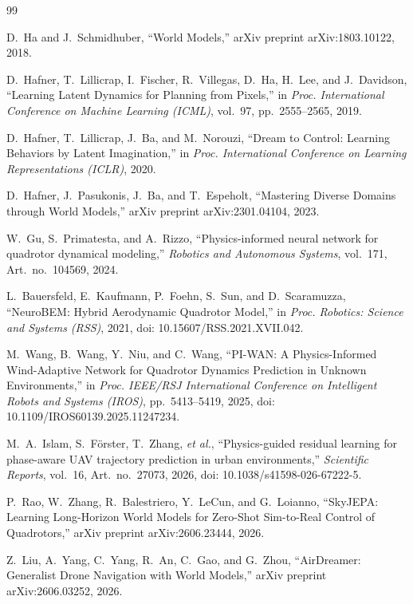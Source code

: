 \documentclass[conference]{IEEEtran}
\begin{document}
\begin{thebibliography}{99}

D.~Ha and J.~Schmidhuber,
``World Models,''
arXiv preprint arXiv:1803.10122, 2018.

D.~Hafner, T.~Lillicrap, I.~Fischer, R.~Villegas, D.~Ha, H.~Lee,
and J.~Davidson,
``Learning Latent Dynamics for Planning from Pixels,''
in \emph{Proc. International Conference on Machine Learning (ICML)},
vol.~97, pp.~2555--2565, 2019.

D.~Hafner, T.~Lillicrap, J.~Ba, and M.~Norouzi,
``Dream to Control: Learning Behaviors by Latent Imagination,''
in \emph{Proc. International Conference on Learning Representations
(ICLR)}, 2020.

D.~Hafner, J.~Pasukonis, J.~Ba, and T.~Espeholt,
``Mastering Diverse Domains through World Models,''
arXiv preprint arXiv:2301.04104, 2023.

W.~Gu, S.~Primatesta, and A.~Rizzo,
``Physics-informed neural network for quadrotor dynamical modeling,''
\emph{Robotics and Autonomous Systems}, vol.~171, Art.~no.~104569,
2024.

L.~Bauersfeld, E.~Kaufmann, P.~Foehn, S.~Sun, and D.~Scaramuzza,
``NeuroBEM: Hybrid Aerodynamic Quadrotor Model,''
in \emph{Proc. Robotics: Science and Systems (RSS)}, 2021,
doi: 10.15607/RSS.2021.XVII.042.

M.~Wang, B.~Wang, Y.~Niu, and C.~Wang,
``PI-WAN: A Physics-Informed Wind-Adaptive Network for Quadrotor
Dynamics Prediction in Unknown Environments,''
in \emph{Proc. IEEE/RSJ International Conference on Intelligent Robots
and Systems (IROS)}, pp.~5413--5419, 2025,
doi: 10.1109/IROS60139.2025.11247234.

M.~A.~Islam, S.~Förster, T.~Zhang, \emph{et al.},
``Physics-guided residual learning for phase-aware UAV trajectory
prediction in urban environments,''
\emph{Scientific Reports}, vol.~16, Art.~no.~27073, 2026,
doi: 10.1038/s41598-026-67222-5.

P.~Rao, W.~Zhang, R.~Balestriero, Y.~LeCun, and G.~Loianno,
``SkyJEPA: Learning Long-Horizon World Models for Zero-Shot
Sim-to-Real Control of Quadrotors,''
arXiv preprint arXiv:2606.23444, 2026.

Z.~Liu, A.~Yang, C.~Yang, R.~An, C.~Gao, and G.~Zhou,
``AirDreamer: Generalist Drone Navigation with World Models,''
arXiv preprint arXiv:2606.03252, 2026.


\end{thebibliography}
\end{document}

